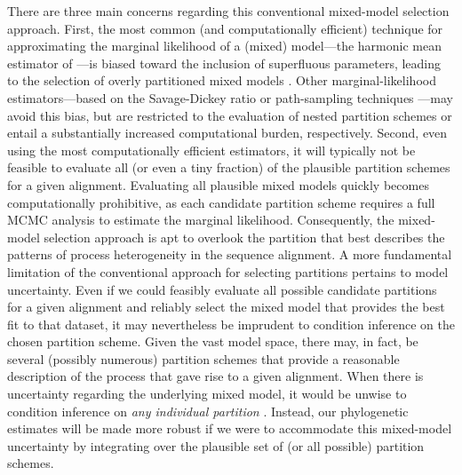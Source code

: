 \documentclass[11pt]{article}
\begin{document}
There are three main concerns regarding this conventional mixed-model selection approach.
First, the most common (and computationally efficient) technique for approximating the marginal likelihood of a (mixed) model---the harmonic mean estimator of \citet{newton94}---is biased toward the inclusion of superfluous parameters, leading to the selection of overly partitioned mixed models \citep[{\it e.g.},][]{lartillot06,brown07,fan11}.  
Other marginal-likelihood estimators---based on the Savage-Dickey ratio \citep[{\it e.g.},][]{verdinelli95,suchard01} or path-sampling techniques \citep[{\it e.g.},][]{lartillot06,fan11,xie11,bael12,bael13,ronquist12}---may avoid this bias, but are restricted to the evaluation of nested partition schemes or entail a substantially increased computational burden, respectively. 
Second, even using the most computationally efficient estimators, it will typically not be feasible to evaluate all (or even a tiny fraction) of the plausible partition schemes for a given alignment.
Evaluating all plausible mixed models quickly becomes computationally prohibitive, as each candidate partition scheme requires a full MCMC analysis to estimate the marginal likelihood.
Consequently, the mixed-model selection approach is apt to overlook the partition that best describes the patterns of process heterogeneity in the sequence alignment.
A more fundamental limitation of the conventional approach for selecting partitions pertains to model uncertainty.
Even if we could feasibly evaluate all possible candidate partitions for a given alignment and reliably select the mixed model that provides the best fit to that dataset, it may nevertheless be imprudent to condition inference on the chosen partition scheme.
Given the vast model space, there may, in fact, be several (possibly numerous) partition schemes that provide a reasonable description of the process that gave rise to a given alignment.
When there is uncertainty regarding the underlying mixed model, it would be unwise to condition inference on {\it any individual partition}  \citep[{\it cf.},][]{huelsenbeck04d, li12}.
Instead, our phylogenetic estimates will be made more robust if we were to accommodate this mixed-model uncertainty by integrating over the plausible set of (or all possible) partition schemes.
\end{document}
